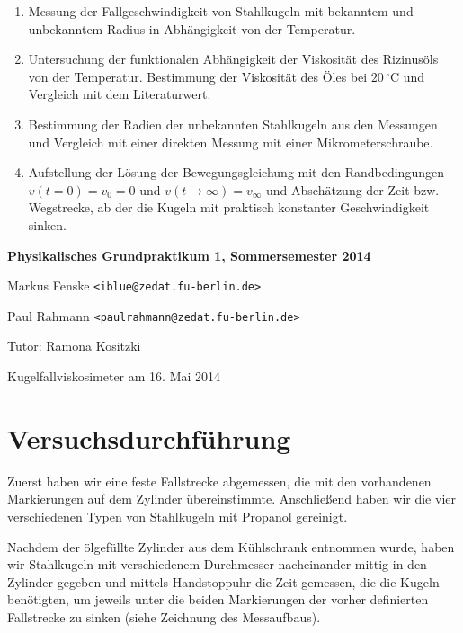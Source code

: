 \documentclass[a4paper,german,12pt,smallheadings]{scrartcl}
\begin{document}
\begin{enumerate}[1.]
  \item Messung der Fallgeschwindigkeit von Stahlkugeln mit bekanntem und
    unbekanntem Radius in Abhängigkeit von der Temperatur.
  \item Untersuchung der funktionalen Abhängigkeit der Viskosität des
    Rizinusöls von der Temperatur. Bestimmung der Viskosität des Öles bei $20
    \,^{\circ}\mathrm{C}$ und Vergleich mit dem Literaturwert.
  \item
    Bestimmung der Radien der unbekannten Stahlkugeln aus den Messungen und
    Vergleich mit einer direkten Messung mit einer Mikrometerschraube.
  \item Aufstellung der Lösung der Bewegungsgleichung mit den Randbedingungen
    $v(t=0) = v_0 = 0$ und $v(t \to \infty) = v_\infty$ und Abschätzung der
    Zeit bzw. Wegstrecke, ab der die Kugeln mit praktisch konstanter
    Geschwindigkeit sinken.
\end{enumerate}

\newpage
\begin{center}
\bfseries %
\sffamily %
\vspace{-40pt}
Physikalisches Grundpraktikum 1, Sommersemester 2014

Markus Fenske \texttt{<iblue@zedat.fu-berlin.de>}

Paul Rahmann \texttt{<paulrahmann@zedat.fu-berlin.de>}

Tutor: Ramona Kositzki

Kugelfallviskosimeter am 16. Mai 2014
\vspace{-10pt}
\end{center}

\section*{Versuchsdurchführung}
Zuerst haben wir eine feste Fallstrecke abgemessen, die mit den vorhandenen
Markierungen auf dem Zylinder übereinstimmte. Anschließend haben wir die vier
verschiedenen Typen von Stahlkugeln mit Propanol gereinigt.

Nachdem der ölgefüllte Zylinder aus dem Kühlschrank entnommen wurde, haben wir
Stahlkugeln mit verschiedenem Durchmesser nacheinander mittig in den Zylinder
gegeben und mittels Handstoppuhr die Zeit gemessen, die die Kugeln benötigten,
um jeweils unter die beiden Markierungen der vorher definierten Fallstrecke zu
sinken (siehe Zeichnung des Messaufbaus).
\end{document}
